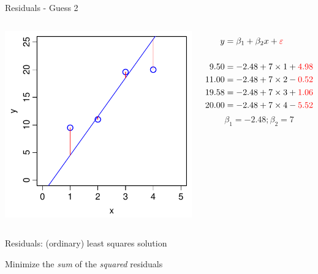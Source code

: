 \documentclass[xcolor=x11names,compress]{beamer}
\renewcommand{\(}{\begin{columns}}
\renewcommand{\)}{\end{columns}}
\newcommand{\<}[1]{\begin{column}{#1}}
\renewcommand{\>}{\end{column}}
\begin{document}
\begin{frame}{Residuals  - Guess 2}
\begin{columns}[T]

		\includegraphics[width=\textwidth]{TooSteep.pdf}
		
		\begin{align*}
		  y  &= \beta_1 + \beta_2 x + {\color{red} \varepsilon }\\
		  \\
		  9.50  &= -2.48 + 7 \times 1 + {\color{red} 4.98}\\
		  11.00 &= -2.48 + 7 \times 2 - {\color{red} 0.52}\\
		  19.58 &= -2.48 + 7 \times 3 + {\color{red} 1.06}\\
		  20.00 &= -2.48 + 7 \times 4 - {\color{red} 5.52} 
		\end{align*}
		\[\beta_1 = -2.48; \beta_2=7\]

\end{columns}		
\end{frame}

\begin{frame}{Residuals: (ordinary) least squares solution}

Minimize the {\it sum} of the {\it squared} residuals

\begin{columns}[T]
\column{\textwidth}

\end{columns}
\end{frame}
\end{document}
